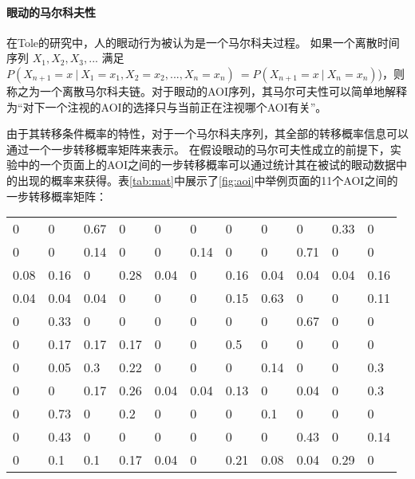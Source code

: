 \paragraph{眼动的马尔科夫性}
在Tole的研究中，人的眼动行为被认为是一个马尔科夫过程。
如果一个离散时间序列 $X_1,X_2,X_3,...$ 满足$P(X_{n+1}=x~|~X_1=x_1,X_2=x_2,...,X_n=x_n)~=P(X_{n+1}=x~|~X_n=x_n)$)，则称之为一个离散马尔科夫链。对于眼动的AOI序列，其马尔可夫性可以简单地解释为“对下一个注视的AOI的选择只与当前正在注视哪个AOI有关”。

由于其转移条件概率的特性，对于一个马尔科夫序列，其全部的转移概率信息可以通过一个一步转移概率矩阵来表示。
在假设眼动的马尔可夫性成立的前提下，实验中的一个页面上的AOI之间的一步转移概率可以通过统计其在被试的眼动数据中的出现的概率来获得。表\ref{tab:mat}中展示了\ref{fig:aoi}中举例页面的11个AOI之间的一步转移概率矩阵：

\begin{table}[H]
\centering
  \begin{tabular}{@{}lllllllllll@{}}
  \hline
  0    & 0    & 0.67 & 0    & 0    & 0    & 0    & 0    & 0    & 0.33 & 0    \\
  0    & 0    & 0.14 & 0    & 0    & 0.14 & 0    & 0    & 0.71 & 0    & 0    \\
  0.08 & 0.16 & 0    & 0.28 & 0.04 & 0    & 0.16 & 0.04 & 0.04 & 0.04 & 0.16 \\
  0.04 & 0.04 & 0.04 & 0    & 0    & 0    & 0.15 & 0.63 & 0    & 0    & 0.11 \\
  0    & 0.33 & 0    & 0    & 0    & 0    & 0    & 0    & 0.67 & 0    & 0    \\
  0    & 0.17 & 0.17 & 0.17 & 0    & 0    & 0.5  & 0    & 0    & 0    & 0    \\
  0    & 0.05 & 0.3  & 0.22 & 0    & 0    & 0    & 0.14 & 0    & 0    & 0.3  \\
  0    & 0    & 0.17 & 0.26 & 0.04 & 0.04 & 0.13 & 0    & 0.04 & 0    & 0.3  \\
  0    & 0.73 & 0    & 0.2  & 0    & 0    & 0    & 0.1  & 0    & 0    & 0    \\
  0    & 0.43 & 0    & 0    & 0    & 0    & 0    & 0    & 0.43 & 0    & 0.14 \\
  0    & 0.1  & 0.1  & 0.17 & 0.04 & 0    & 0.21 & 0.08 & 0.04 & 0.29 & 0\\
  \hline
  \end{tabular}
\end{table}

